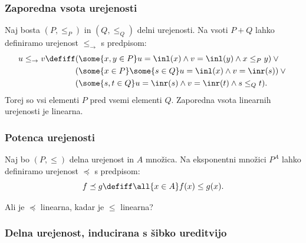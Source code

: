 \subsubsection{Zaporedna vsota urejenosti}

Naj bosta $(P, \leq_P)$ in $(Q, \leq_Q)$ delni urejenosti. Na vsoti $P + Q$ lahko definiramo urejenost $\leq_{\to}$ s predpisom:
%
\begin{equation*}
  u \leq_{\to} v \defiff
  \begin{aligned}[t]
    &(\some{x, y \in P} u = \inl(x) \land v = \inl(y) \land x \leq_P y) \lor {} \\
    &(\some{x \in P} \some{s \in Q} u = \inl(x) \land v = \inr(s)) \lor {} \\
    &(\some{s, t \in Q} u = \inr(s) \land v = \inr(t) \land s \leq_Q t).
  \end{aligned}
\end{equation*}
%
Torej so vsi elementi $P$ pred vsemi elementi $Q$. Zaporedna vsota linearnih urejenosti je linearna.


\subsubsection{Potenca urejenosti}

Naj bo $(P, \leq)$ delna urejenost in $A$ množica. Na eksponentni množici $P^A$ lahko definiramo urejenost $\preceq$ s predpisom:
%
\begin{equation*}
  f \preceq g \defiff \all{x \in A} f(x) \leq g(x).
\end{equation*}

\begin{vaja}
  Ali je $\preceq$ linearna, kadar je $\leq$ linearna?
\end{vaja}


\subsubsection{Delna urejenost, inducirana s šibko ureditvijo}

